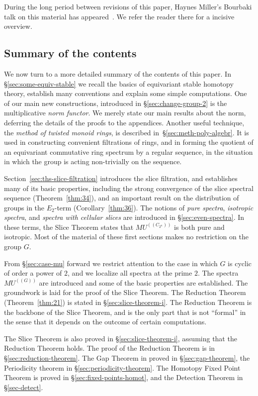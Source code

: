 \documentclass{amsart}
\theoremstyle{definition}
\theoremstyle{remark}
\newcommand{\mutn}[1]{MU^{(\!(#1)\!)}}
\newcommand{\ztn}{C_{2^{n}}}
\begin{document}
During the long period between revisions of this paper, Haynes
Miller's Bourbaki talk on this material has appeared~\cite{MR3050712}.
We refer the reader there for a incisive overview.

\subsection{Summary of the contents}

We now turn to a more detailed summary of the contents of this paper.
In \S\ref{sec:some-equiv-stable} we recall the basics of equivariant
stable homotopy theory, establish many conventions and explain some
simple computations.  One of our main new constructions, introduced in
\S\ref{sec:change-group-2} is the multiplicative {\em norm functor}.
We merely state our main results about the norm, deferring the details
of the proofs to the appendices.  Another useful technique, the {\em
method of twisted monoid rings}, is described
in~\S\ref{sec:meth-poly-algebr}.  It is used in constructing
convenient filtrations of rings, and in forming the quotient of an
equivariant commutative ring spectrum by a regular sequence, in the
situation in which the group is acting non-trivially on the sequence.

Section~\ref{sec:ths-slice-filtration} introduces the slice
filtration, and establishes many of its basic properties, including
the strong convergence of the slice spectral sequence
(Theorem~\ref{thm:34}), and an important result on the distribution of
groups in the $E_{2}$-term (Corollary~\ref{thm:36}).  The notions of
{\em pure spectra}, {\em isotropic spectra}, and {\em spectra with
cellular slices} are introduced in \S\ref{sec:even-spectra}.  In these
terms, the Slice Theorem states that $\mutn{\ztn}$ is both pure and
isotropic.  Most of the material of these first sections makes no
restriction on the group $G$.  

From \S\ref{sec:case-mu} forward we restrict attention to the case in
which $G$ is cyclic of order a power of $2$, and we localize all
spectra at the prime $2$.  The spectra $\mutn{G}$ are introduced and
some of the basic properties are established.  The groundwork is laid
for the proof of the Slice Theorem.  The Reduction Theorem
(Theorem~\ref{thm:21}) is stated in \S\ref{sec:slice-theorem-i}.  The
Reduction Theorem is the backbone of the Slice Theorem, and is the
only part that is not ``formal'' in the sense that it depends on the
outcome of certain computations.

The Slice Theorem is also proved in \S\ref{sec:slice-theorem-i},
assuming that the Reduction Theorem holds.  The proof of the Reduction
Theorem is in \S\ref{sec:reduction-theorem}.  The Gap Theorem in
proved in \S\ref{sec:gap-theorem}, the Periodicity theorem in
\S\ref{sec:periodicity-theorem}.  The Homotopy Fixed Point Theorem is
proved in \S\ref{sec:fixed-points-homot}, and the Detection Theorem in
\S\ref{sec-detect}.
\end{document}
